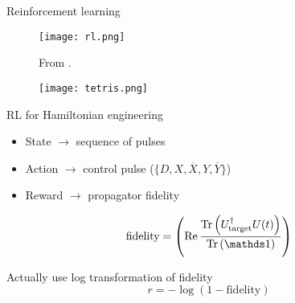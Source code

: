 \documentclass{beamer}
\begin{document}
\begin{frame}{Reinforcement learning}

\begin{figure}
\centering
\texttt{[image: rl.png]}

From \cite{sutton2018reinforcement}.
\end{figure}

\begin{figure}
\centering
\texttt{[image: tetris.png]}
\end{figure}

\end{frame}


\begin{frame}{RL for Hamiltonian engineering}
%















\begin{itemize}
    \item State $\to$ sequence of pulses
    \item Action $\to$ control pulse ($\{ D, X, \overline{X}, Y, \overline{Y} \}$)
    \item Reward $\to$ propagator fidelity
\end{itemize}

\[
\text{fidelity} = \left(\Re{
    \frac{\Tr{U_\text{target}^\dagger U(t)}}{\Tr{\identity}}
}\right)
\]

Actually use log transformation of fidelity
\[
r = -\log(1 - \text{fidelity})
\]




\end{frame}
\end{document}
